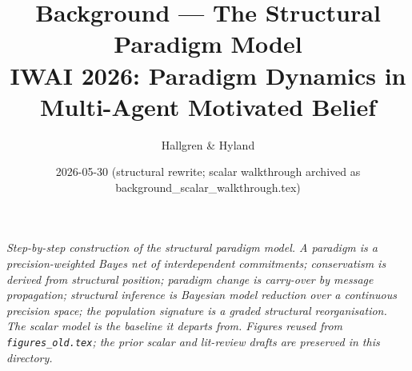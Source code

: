 \documentclass[11pt,a4paper]{article}
\title{Background --- The Structural Paradigm Model\\[2pt]
       \large IWAI 2026: Paradigm Dynamics in Multi-Agent Motivated Belief}
\author{Hallgren \& Hyland}
\date{2026-05-30 (structural rewrite; scalar walkthrough archived as
      background\_scalar\_walkthrough.tex)}
\begin{document}
\maketitle

\noindent\textit{Step-by-step construction of the structural paradigm
model. A paradigm is a precision-weighted Bayes net of interdependent
commitments; conservatism is derived from structural position; paradigm
change is carry-over by message propagation; structural inference is
Bayesian model reduction over a continuous precision space; the
population signature is a graded structural reorganisation. The scalar
model is the baseline it departs from. Figures reused from
\texttt{figures\_old.tex}; the prior scalar and lit-review drafts are
preserved in this directory.}

\bigskip





\end{document}
